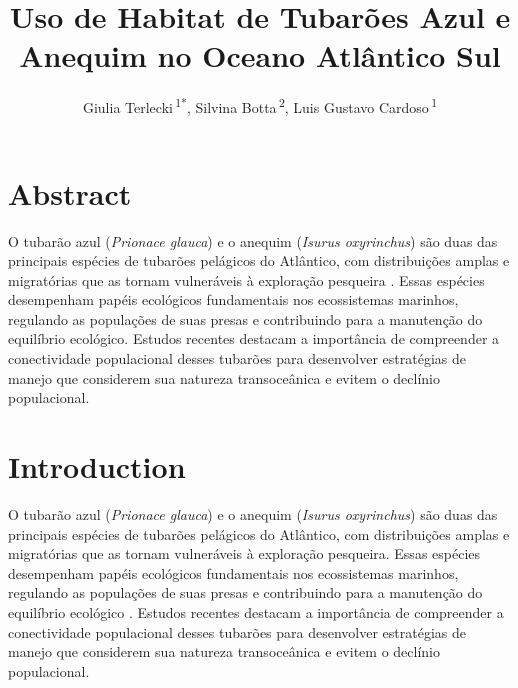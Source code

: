 \documentclass[utf8]{FrontiersinHarvard}
\def\Authors{
  Giulia Terlecki\,\textsuperscript{1*},
  Silvina Botta\,\textsuperscript{2},
  Luis Gustavo Cardoso\,\textsuperscript{1}}
\def\firstAuthorLast{Terlecki {et~al.}}
\begin{document}
\onecolumn
{}


\title[Habitat de Tubarões no Atlântico Sul]{Uso de Habitat de Tubarões
Azul e Anequim no Oceano Atlântico Sul}
\author[\firstAuthorLast]{\Authors}
\address{} %
\correspondance{} %

\extraAuth{}%


\maketitle


\section*{Abstract}\label{abstract}

O tubarão azul (\emph{Prionace glauca}) e o anequim (\emph{Isurus
oxyrinchus}) são duas das principais espécies de tubarões pelágicos do
Atlântico, com distribuições amplas e migratórias que as tornam
vulneráveis à exploração pesqueira . Essas espécies desempenham papéis
ecológicos fundamentais nos ecossistemas marinhos, regulando as
populações de suas presas e contribuindo para a manutenção do equilíbrio
ecológico. Estudos recentes destacam a importância de compreender a
conectividade populacional desses tubarões para desenvolver estratégias
de manejo que considerem sua natureza transoceânica e evitem o declínio
populacional.

\section*{Introduction}\label{introduction}

O tubarão azul (\emph{Prionace glauca}) e o anequim (\emph{Isurus
oxyrinchus}) são duas das principais espécies de tubarões pelágicos do
Atlântico, com distribuições amplas e migratórias que as tornam
vulneráveis à exploração pesqueira. Essas espécies desempenham papéis
ecológicos fundamentais nos ecossistemas marinhos, regulando as
populações de suas presas e contribuindo para a manutenção do equilíbrio
ecológico . Estudos recentes destacam a importância de compreender a
conectividade populacional desses tubarões para desenvolver estratégias
de manejo que considerem sua natureza transoceânica e evitem o declínio
populacional.
\end{document}
